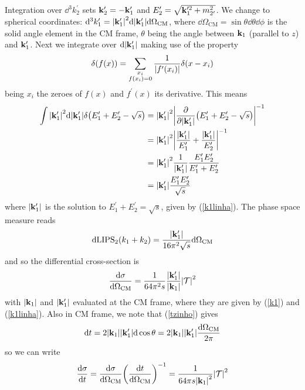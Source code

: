 Integration over $\dd^3 k_2^\prime$ sets $\vb{k}_2^\prime=-\vb{k}_1^\prime$ and $E_2^\prime=\sqrt{\vb{k}_1^{\prime2}+m_{2^\prime}^2}$. We change to spherical coordinates: $\dd^3k_1^\prime=\abs{\vb{k}_1^\prime}^2\dd \abs{\vb{k}_1^\prime}\dd \Omega_{\text{CM}}$, where $\dd\Omega_{\text{CM}}=\sin\theta\dd\theta\dd\phi$ is the solid angle element in the CM frame, $\theta$ being the angle between $\vb{k}_1$ (parallel to $z$) and $\vb{k}_1^\prime$. Next we integrate over $\dd \abs{\vb{k}_1^\prime}$ making use of the property
\begin{equation}
    \delta(f(x))=\sum_{\substack{x_i\\{f(x_i)=0}}}\frac{1}{\abs{f^\prime(x_i)}}\delta(x-x_i)
\end{equation}
being $x_i$ the zeroes of $f(x)$ and $f^\prime(x)$ its derivative. This means
\begin{equation}
    \begin{aligned}
        \int\abs{\vb{k}_1^\prime}^2\dd\abs{\vb{k}_1^\prime}\delta\qty(E_1^\prime+E_2^\prime-\sqrt{s})&=\abs{\vb{k}_1^\prime}^2\abs{\pdv{\abs{\vb{k}_1^\prime}}(E_1^\prime+E_2^\prime-\sqrt{s})}^{-1}\\
        &=\abs{\vb{k}_1^\prime}^2\abs{\frac{\abs{\vb{k}_1^\prime}}{E_1^\prime}+\frac{\abs{\vb{k}_1^\prime}}{E_2^\prime}}^{-1}\\
        &=\abs{\vb{k}_1^\prime}^2\frac{1}{\abs{\vb{k}_1^\prime}}\frac{E_1^\prime E_2^\prime}{E_1^\prime+E_2^\prime}\\
        &=\abs{\vb{k}_1^\prime}\frac{E_1^\prime E_2^\prime}{\sqrt{s}}
    \end{aligned}
\end{equation}
where $\abs{\vb{k}_1^\prime}$ is the solution to $E_1^\prime+E_2^\prime=\sqrt{s}$, given by (\ref{k1linha}). The phase space measure reads 
\begin{equation}
\dd \text{LIPS}_{2}(k_1+k_2)=\frac{\abs{\vb{k}_1^\prime}}{16\pi^2\sqrt{s}}\dd\Omega_{\text{CM}}   
\label{dlips2}
\end{equation}
and so the differential cross-section is
\begin{equation}
    \dv{\sigma}{\Omega_{\text{CM}}}=\frac{1}{64\pi^2s}\frac{\abs{\vb{k}_1^\prime}}{\abs{\vb{k}_1}}\abs{\mathcal{T}}^2
\end{equation}
with $\abs{\vb{k}_1}$ and $\abs{\vb{k}_1^\prime}$ evaluated at the CM frame, where they are given by (\ref{k1}) and (\ref{k1linha}). Also in CM frame, we note that (\ref{tzinho}) gives
\begin{equation}
    \dd t=2\abs{\vb{k}_1}\abs{\vb{k}_1^\prime}\dd \cos \theta=2\abs{\vb{k}_1}\abs{\vb{k}_1^\prime}\frac{\dd \Omega_{\text{CM}}}{2\pi}
\end{equation}
so we can write
\begin{equation}
    \dv{\sigma}{t}=\dv{\sigma}{\Omega_{\text{CM}}}\qty(\dv{t}{\Omega_{\text{CM}}})^{-1}=\frac{1}{64\pi s\abs{\vb{k}_1}^2}\abs{\mathcal{T}}^2
    \label{dsigmadt}
\end{equation}


